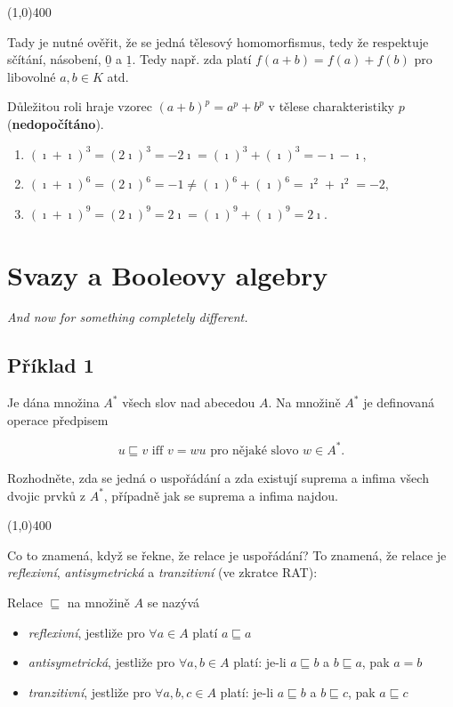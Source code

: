 \documentclass{article}
\begin{document}
\line(1,0){400}

Tady je nutné ověřit, že se jedná tělesový homomorfismus, tedy že respektuje sčítání, násobení, $\underline{0}$ a $\underline{1}$. Tedy např. zda platí $f(a+b) = f(a) + f(b)$ pro libovolné $a,b \in K$ atd.

Důležitou roli hraje vzorec $(a+b)^p = a^p+b^p$ v tělese charakteristiky $p$ (\textbf{nedopočítáno}).

\begin{enumerate}
	\item $(\imath + \imath)^3 = (2\imath)^3 = -2\imath = (\imath)^3 + (\imath)^3 = -\imath - \imath$,
	\item $(\imath + \imath)^6 = (2\imath)^6 = -1 \neq (\imath)^6 + (\imath)^6 =  \imath^2 + \imath^2 = -2$,
	\item $(\imath + \imath)^9 = (2\imath)^9 = 2\imath = (\imath)^9 + (\imath)^9 = 2\imath$.
\end{enumerate}


\clearpage

\section{Svazy a Booleovy algebry}

\begin{flushright}
\parbox[h]{3in}{
\emph{And now for something completely different.}
}
\end{flushright}

\subsection{Příklad 1}
Je dána množina $A^*$ všech slov nad abecedou $A$. Na množině $A^*$ je definovaná operace předpisem

\[ u \sqsubseteq v \text{ iff } v = wu \text{ pro nějaké slovo } w \in A^*. \]

Rozhodněte, zda se jedná o uspořádání a zda existují suprema a infima všech dvojic prvků z $A^*$, případně jak se suprema a infima najdou.
 
\line(1,0){400}

Co to znamená, když se řekne, že relace je uspořádání? To znamená, že relace je \emph{reflexivní}, \emph{antisymetrická} a \emph{tranzitivní} (ve zkratce \textsc{RAT}):

Relace $\sqsubseteq$ na množině $A$ se nazývá 
\begin{itemize}
 \item \emph{reflexivní}, jestliže pro $\forall a \in A$ platí $a \sqsubseteq a$
 \item \emph{antisymetrická}, jestliže pro $\forall a,b \in A$ platí: je-li $a \sqsubseteq b$ a $b \sqsubseteq a$, pak $a = b$
 \item \emph{tranzitivní}, jestliže pro $\forall a,b,c \in A$ platí: je-li $a \sqsubseteq b$ a $b \sqsubseteq c$, pak $a \sqsubseteq c$
\end{itemize} 
\end{document}

